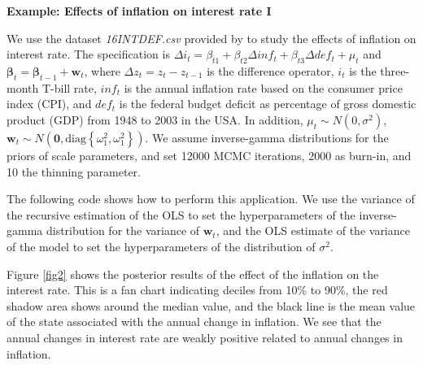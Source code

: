 \textbf{Example: Effects of inflation on interest rate I}

We use the dataset \textit{16INTDEF.csv} provided by \cite[Chaps.~10]{wooldridge2016introductory} to study the effects of inflation on interest rate. The specification is $\Delta i_t=\beta_{t1}+\beta_{t2}\Delta inf_t+\beta_{t3}\Delta def_t+\mu_t$ and $\bm{\beta}_t=\bm{\beta}_{t-1}+\bm{w}_t$, where $\Delta z_t=z_{t}-z_{t-1}$ is the difference operator, $i_t$ is the three-month T-bill rate, $inf_t$ is the annual inflation rate based on the consumer price index (CPI), and $def_t$ is the federal budget deficit as percentage of gross domestic product (GDP) from 1948 to 2003 in the USA. In addition, $\mu_t\sim N(0,\sigma^2)$, $\bm{w}_t\sim N(\bm{0},\text{diag}\left\{\omega_1^2,\omega_1^2\right\})$. We assume inverse-gamma distributions for the priors of scale parameters, and set 12000 MCMC iterations, 2000 as burn-in, and 10 the thinning parameter.

The following code shows how to perform this application. We use the variance of the recursive estimation of the OLS to set the hyperparameters of the inverse-gamma distribution for the variance of $\bm{w}_t$, and the OLS estimate of the variance of the model to set the hyperparameters of the distribution of $\sigma^2$.

Figure \ref{fig2} shows the posterior results of the effect of the inflation on the interest rate. This is a fan chart indicating deciles from 10\% to 90\%, the red shadow area shows around the median value, and the black line is the mean value of the state associated with the annual change in inflation. We see that the annual changes in interest rate are weakly positive related to annual changes in inflation. 

